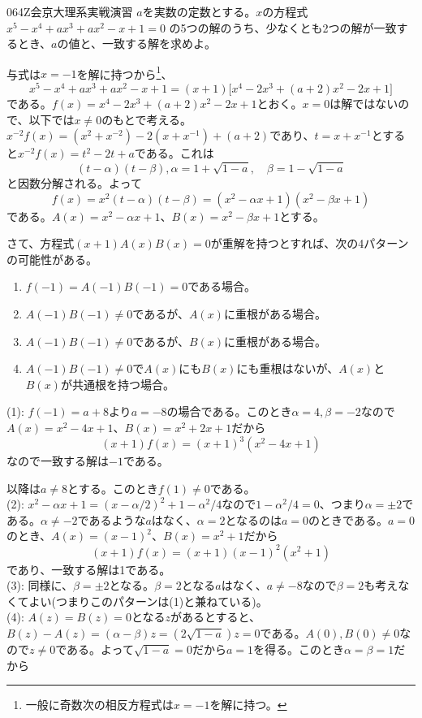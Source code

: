 \begin{thm}{064}{}{Z会京大理系実戦演習}
 $a$を実数の定数とする。$x$の方程式 $x^5-x^4+ax^3+ax^2-x+1=0$ の5つの解のうち、少なくとも2つの解が一致するとき、$a$の値と、一致する解を求めよ。
\end{thm}


与式は$x=-1$を解に持つから\footnote{一般に奇数次の相反方程式は$x=-1$を解に持つ。}、
\[ x^5-x^4+ax^3+ax^2-x+1=(x+1)\bigl[x^4-2x^3+(a+2)x^2-2x+1\bigr] \]
である。$f(x)=x^4-2x^3+(a+2)x^2-2x+1$とおく。$x=0$は解ではないので、以下では$x\neq 0$のもとで考える。 $x^{-2}f(x) = (x^2 + x^{-2}) - 2(x+x^{-1}) + (a+2)$であり、$t=x+x^{-1}$とすると$x^{-2}f(x) = t^2 - 2t + a$である。これは
\[(t - \alpha)(t-\beta), \alpha = 1+\sqrt{1-a},\quad \beta = 1-\sqrt{1-a}\]
と因数分解される。よって
\[f(x) = x^2(t-\alpha)(t-\beta) = (x^2 - \alpha x + 1)(x^2-\beta x + 1)\]
である。$A(x) = x^2-\alpha x  +1 $、$B(x) = x^2-\beta x + 1$とする。\par
さて、方程式$(x+1)A(x)B(x) = 0$が重解を持つとすれば、次の4パターンの可能性がある。
\begin{enumerate} 
\item $f(-1) = A(-1)B(-1)  = 0$である場合。
\item $A(-1)B(-1)\neq 0$であるが、$A(x)$に重根がある場合。
\item $A(-1)B(-1)\neq 0$であるが、$B(x)$に重根がある場合。
\item $A(-1)B(-1)\neq 0$で$A(x)$にも$B(x)$にも重根はないが、$A(x)$と$B(x)$が共通根を持つ場合。
\end{enumerate}
(1): $f(-1) = a+8$より$a=-8$の場合である。このとき$\alpha = 4, \beta = -2$なので$A(x) = x^2-4x + 1$、$B(x) = x^2 + 2x + 1$だから
\[(x+1)f(x) = (x+1)^3 (x^2-4x + 1)\]
なので一致する解は$-1$である。\par 
以降は$a\neq 8$とする。このとき$f(1)\neq 0$である。\\
(2): $x^2 - \alpha x + 1 = (x-\alpha /2)^2 + 1 - \alpha^2/4$なので$1-\alpha^2/4 = 0$、つまり$\alpha = \pm 2$である。$\alpha\neq -2$であるような$a$はなく、$\alpha=2$となるのは$a=0$のときである。$a=0$のとき、$A(x) = (x-1)^2$、$B(x) =x^2+1$だから
\[(x+1)f(x) = (x+1)(x-1)^2(x^2+1)\]
であり、一致する解は1である。\\
(3): 同様に、$\beta = \pm 2$となる。$\beta = 2$となる$a$はなく、$a\neq -8$なので$\beta = 2$も考えなくてよい(つまりこのパターンは(1)と兼ねている)。\\
(4): $A(z) = B(z) = 0$となる$z$があるとすると、$B(z) - A(z) = (\alpha - \beta)z = (2\sqrt{1-a} )z = 0$である。$A(0),B(0)\neq 0$なので$z\neq 0$である。よって$\sqrt{1-a}=0$だから$a=1$を得る。このとき$\alpha = \beta = 1$だから
